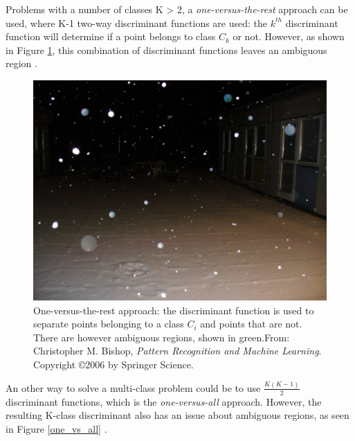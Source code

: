 \noindent Problems with a number of classes K > 2, a \textit{one-versus-the-rest} approach can be used, where K-1 two-way discriminant functions are used: the $k^{th}$ discriminant function will determine if a point belongs to class $C_k$ or not. However, as shown in Figure \ref{one_vs_rest}, this combination of discriminant functions leaves an ambiguous region \cite{BIS06}. 
\newline

\begin{figure}[!h]
\begin{center}
\noindent \includegraphics[scale=0.1]{figures/one_vs_rest} 
\newline
\caption{One-versus-the-rest approach: the discriminant function is used to separate points belonging to a class $C_i$ and points that are not. There are however ambiguous regions, shown in green.From: Christopher M. Bishop, \textit{Pattern Recognition and Machine Learning}. Copyright \copyright  2006 by Springer Science.}
\label{one_vs_rest}
\end{center} 
\end{figure}

\noindent An other way to solve a multi-class problem could be to use $\frac{K(K-1)}{2}$ discriminant functions, which is the \textit{one-versus-all} approach. However, the resulting K-class discriminant also has an issue about ambiguous regions, as seen in Figure \ref{one_vs_all} \cite{BIS06}.
\newline

